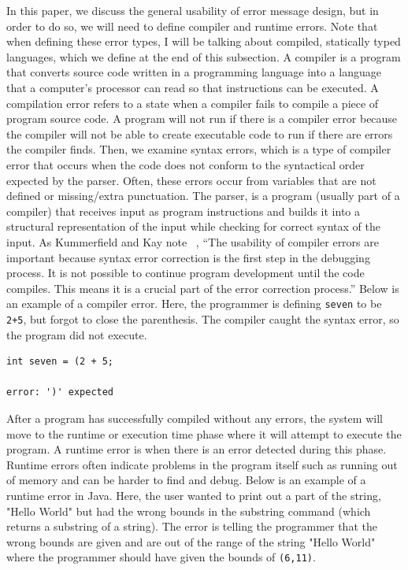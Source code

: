 \documentclass{sig-alternate}
\begin{document}

In this paper, we discuss the general usability of error message design, but in order to do so, we will need to define compiler and runtime errors.
Note that when defining these error types, I will be talking about compiled, statically typed languages, which we define at the end of this subsection.
A compiler is a program that converts source code written in a programming language into a language that a computer's processor can read so that instructions can be executed.
A compilation error refers to a state when a compiler fails to compile a piece of  program source code.
A program will not run if there is a compiler error because the compiler will not be able to create executable code to run if there are errors the compiler finds. 
Then, we examine syntax errors, which is a type of compiler error that occurs when the code does not conform to the syntactical order expected by the parser.
Often, these errors occur from variables that are not defined or missing/extra punctuation.
The parser, is a program (usually part of a compiler) that receives input as program instructions and builds it into a structural representation of the input while checking for correct syntax of the input.
As Kummerfield and Kay note ~\cite{Kummerfeld:2003:NBF:858403.858416}, ``The usability of compiler errors are important because syntax error correction is the first step in the debugging process. It is not possible to continue program development until the code compiles. This means it is a crucial part of the error correction process.''
Below is an example of a compiler error. Here, the programmer is defining \texttt{seven} to be \texttt{2+5}, but forgot to close the parenthesis. The compiler caught the syntax error, so the program did not execute.

\begin{verbatim}
int seven = (2 + 5;

error: ')' expected
\end{verbatim}

After a program has successfully compiled without any errors, the system will move to the runtime or execution time phase where it will attempt to execute the program.
A runtime error is when there is an error detected during this phase.
Runtime errors often indicate problems in the program itself such as running out of memory and can be harder to find and debug.
Below is an example of a runtime error in Java.
Here, the user wanted to print out a part of the string, "Hello World" but had the wrong bounds in the substring command (which returns a substring of a string).
The error is telling the programmer that the wrong bounds are given and are out of the range of the string "Hello World" where the programmer should have given the bounds of \texttt{(6,11)}.
\end{document}
